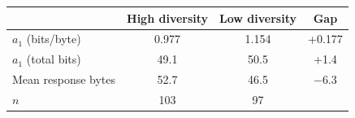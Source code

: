 \begin{tabular}{lccc}
\toprule
 & High diversity & Low diversity & Gap \\
\midrule
$a_1$ (bits/byte) & 0.977 & 1.154 & +0.177 \\
$a_1$ (total bits) & 49.1 & 50.5 & +1.4 \\
Mean response bytes & 52.7 & 46.5 & $-6.3$ \\
$n$ & 103 & 97 & \\
\bottomrule
\end{tabular}

